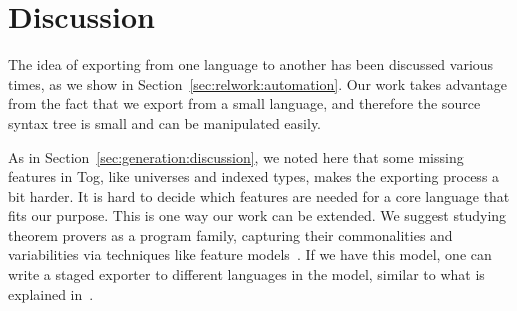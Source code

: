 \section{Discussion}
\label{sec:exporting:discussion}
The idea of exporting from one language to another has been discussed various times, as we show in Section~\ref{sec:relwork:automation}. Our work takes advantage from the fact that we export from a small language, and therefore the source syntax tree is small and can be manipulated easily.  

As in Section~\ref{sec:generation:discussion}, we noted here that some missing features in Tog, like universes and indexed types, makes the exporting process a bit harder. It is hard to decide which features are needed for a core language that fits our purpose. This is one way our work can be extended. We suggest studying theorem provers as a program family, capturing their commonalities and variabilities via techniques like feature models~\cite{czarnecki2000generative}. If we have this model, one can write a staged exporter to different languages in the model, similar to what is explained in~\cite{stagedConfig}. 


